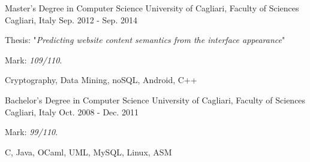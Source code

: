 

\begin{cventries}

  \cventrywithtags
    {Master's Degree in Computer Science} %
    {University of Cagliari, Faculty of Sciences } %
    {Cagliari, Italy} %
    {Sep. 2012 - Sep. 2014} %
    {
      \begin{cvitems}
		    \item {Thesis: "\textit{Predicting website content semantics from the interface appearance}" }
		    \item {Mark: \textit{109/110}.}
      \end{cvitems}
    }
    {Cryptography, Data Mining, noSQL, Android, C++}


  \cventrywithtags
  {Bachelor's Degree in Computer Science} %
  {University of Cagliari, Faculty of Sciences } %
  {Cagliari, Italy} %
  {Oct. 2008 - Dec. 2011} %
  {
    \begin{cvitems}
      \item {Mark: \textit{99/110}.}
    \end{cvitems}
  }
  {C, Java, OCaml, UML, MySQL, Linux, ASM}

\end{cventries}
